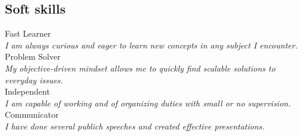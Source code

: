 \documentclass[letterpaper]{soragna-onepage-twocols} %
\begin{document}
\begin{minipage}[t]{0.3\textwidth}
\subsection{Soft skills}

Fast Learner\\
\emph{I am always curious and eager to learn new concepts in any subject I encounter.}\\
Problem Solver\\
\emph{My objective-driven mindset allows me to quickly find scalable solutions to everyday issues.}\\
Independent\\
\emph{I am capable of working and of organizing duties with small or no supervision.}\\
Communicator\\
\emph{I have done several publich speeches and created effective presentations.}\\


\end{minipage} %
\hfill
%
%
%
%
\end{document}
